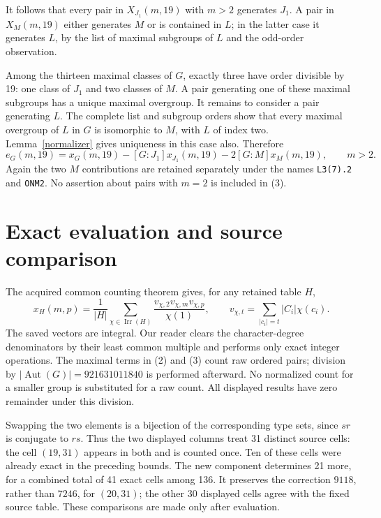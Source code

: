 \documentclass[11pt,a4paper]{article}
\newcommand{\Aut}{\operatorname{Aut}}
\begin{document}
It follows that every pair in $X_{J_1}(m,19)$ with $m>2$ generates
$J_1$. A pair in $X_M(m,19)$ either generates $M$ or is contained in
$L$; in the latter case it generates $L$, by the list of maximal
subgroups of $L$ and the odd-order observation.

Among the thirteen maximal classes of $G$, exactly three have order
divisible by 19: one class of $J_1$ and two classes of $M$.
A pair generating one of these maximal subgroups has a unique maximal
overgroup. It remains to consider a pair generating $L$.
The complete list and subgroup orders show that every maximal overgroup
of $L$ in $G$ is isomorphic to $M$, with $L$ of index two.
Lemma~\ref{normalizer} gives uniqueness in this case also. Therefore
\[
 e_G(m,19)=x_G(m,19)-[G:J_1]x_{J_1}(m,19)
                    -2[G:M]x_M(m,19),\qquad m>2. \tag{3}
\]
Again the two $M$ contributions are retained separately under the names
\texttt{L3(7).2} and \texttt{ONM2}. No assertion about pairs with $m=2$
is included in (3).

\section{Exact evaluation and source comparison}
The acquired common counting theorem gives, for any retained table $H$,
\[
 x_H(m,p)=\frac{1}{|H|}\sum_{\chi\in\operatorname{Irr}(H)}
 \frac{v_{\chi,2}v_{\chi,m}v_{\chi,p}}{\chi(1)},\qquad
 v_{\chi,t}=\sum_{|c_i|=t}|C_i|\chi(c_i). \tag{4}
\]
The saved vectors are integral. Our reader clears the character-degree
denominators by their least common multiple and performs only exact
integer operations. The maximal terms in (2) and (3) count raw ordered
pairs; division by $|\Aut(G)|=921631011840$ is performed afterward.
No normalized count for a smaller group is substituted for a raw count.
All displayed results have zero remainder under this division.



Swapping the two elements is a bijection of the corresponding type
sets, since $sr$ is conjugate to $rs$. Thus the two displayed columns
treat 31 distinct source cells: the cell $(19,31)$ appears in both and
is counted once. Ten of these cells were already exact in the preceding
bounds. The new component determines 21 more, for a combined total of
41 exact cells among 136. It preserves the correction $9118$, rather
than $7246$, for $(20,31)$; the other 30 displayed cells agree with the
fixed source table. These comparisons are made only after evaluation.
\end{document}
